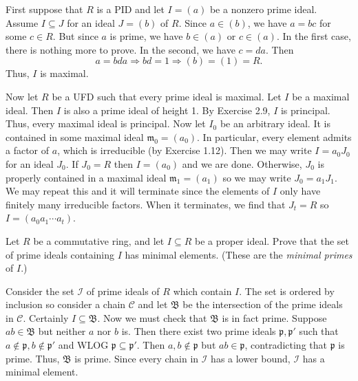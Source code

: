 \documentclass[../../master.tex]{subfiles}
\begin{document}
    \begin{solution}
        First suppose that $R$ is a PID and let $I = (a)$ be a nonzero prime
        ideal. Assume $I \subseteq J$ for an ideal $J = (b)$ of $R$. Since $a
        \in (b)$, we have $a = bc$ for some $c \in R$. But since $a$ is prime,
        we have $b \in (a)$ or $c \in (a)$. In the first case, there is nothing
        more to prove. In the second, we have $c = da$. Then
        \[
            a = bda \Longrightarrow bd = 1 \Longrightarrow (b) = (1) = R.
        \] 
        Thus, $I$ is maximal.

        Now let $R$ be a UFD such that every prime ideal is maximal. Let $I$ be
        a maximal ideal. Then $I$ is also a prime ideal of height 1. By Exercise
        2.9, $I$ is principal. Thus, every maximal ideal is principal. Now let
        $I_0$ be an arbitrary ideal. It is contained in some maximal ideal
        $\mathfrak{m}_0 = (a_0)$. In particular, every element admits a factor of
        $a$, which is irreducible (by Exercise 1.12). Then we may write $I = a_0
        J_0$ for an ideal $J_0$. If $J_0 = R$ then $I = (a_0)$ and we are done.
        Otherwise, $J_0$ is properly contained in a maximal ideal
        $\mathfrak{m}_1 = (a_1)$ so we may write $J_0 = a_1 J_1$. We may repeat
        this and it will terminate since the elements of $I$ only have
        finitely many irreducible factors. When it terminates, we find that $J_t
        = R$ so $I = (a_0 a_1 \cdots a_t)$.
    \end{solution}

    \begin{problem}
        Let $R$ be a commutative ring, and let $I \subseteq R$ be a proper
        ideal. Prove that the set of prime ideals containing $I$ has minimal
        elements. (These are the \textit{minimal primes} of $I.$)
    \end{problem}

    \begin{solution}
        Consider the set $\mathscr{I}$ of prime ideals of $R$ which contain $I$.
        The set is ordered by inclusion so consider a chain $\mathscr{C}$ and
        let $\mathfrak{B}$ be the intersection of the prime ideals in
        $\mathscr{C}$. Certainly $I \subseteq \mathfrak{B}$. Now we must check
        that $\mathfrak{B}$ is in fact prime. Suppose $ab \in \mathfrak{B}$ but
        neither $a$ nor $b$ is. Then there exist two prime ideals
        $\mathfrak{p}, \mathfrak{p}'$ such that $a \notin \mathfrak{p}, b \notin
        \mathfrak{p}'$ and WLOG $\mathfrak{p} \subseteq \mathfrak{p}'$. Then $a,
        b \notin \mathfrak{p}$ but $ab \in \mathfrak{p}$, contradicting that
        $\mathfrak{p}$ is prime. Thus, $\mathfrak{B}$ is prime. Since every
        chain in $\mathscr{I}$ has a lower bound, $\mathscr{I}$ has a minimal
        element.
    \end{solution}
\end{document}
